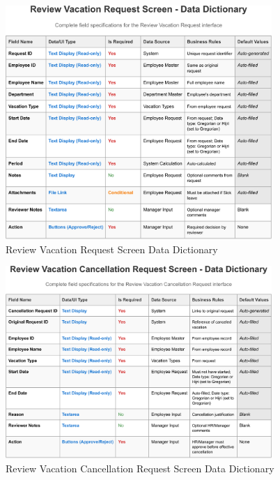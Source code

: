 \documentclass[12pt,a4paper]{article}
\begin{document}
\begin{figure}[H]
\centering
\includegraphics[width=0.9\textwidth]{Data-Dictionary/Screen-Data-Dictionaries/Review-Vacation-Request-Screen-Data-Dictionary/Review-Vacation-Request-Screen-Data-Dictionary-1.png}
\caption{Review Vacation Request Screen Data Dictionary}
\label{fig:review-vacation-data-dict}
\end{figure}

\begin{figure}[H]
\centering
\includegraphics[width=0.9\textwidth]{Data-Dictionary/Screen-Data-Dictionaries/Review-Vacation-Cancellation-Request-Screen-Data-Dictionary/Review-Vacation-Cancellation-Request-Screen-Data-Dictionary-1.png}
\caption{Review Vacation Cancellation Request Screen Data Dictionary}
\label{fig:review-cancellation-data-dict}
\end{figure}
\end{document}
